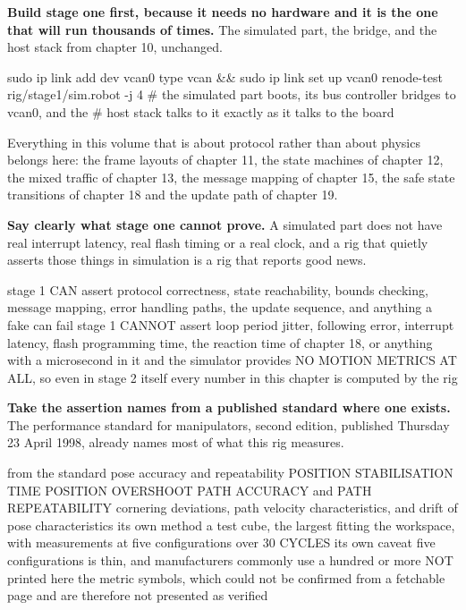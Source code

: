 \begin{steps}
\item \textbf{Build stage one first, because it needs no hardware and it is the
one that will run thousands of times.} The simulated part, the bridge, and the
host stack from chapter 10, unchanged.
\begin{shellcode}
sudo ip link add dev vcan0 type vcan && sudo ip link set up vcan0
renode-test rig/stage1/sim.robot -j 4
# the simulated part boots, its bus controller bridges to vcan0, and the
# host stack talks to it exactly as it talks to the board
\end{shellcode}
Everything in this volume that is about protocol rather than about physics
belongs here: the frame layouts of chapter 11, the state machines of chapter 12,
the mixed traffic of chapter 13, the message mapping of chapter 15, the safe
state transitions of chapter 18 and the update path of chapter 19.

\item \textbf{Say clearly what stage one cannot prove.} A simulated part does
not have real interrupt latency, real flash timing or a real clock, and a rig
that quietly asserts those things in simulation is a rig that reports good news.
\begin{plaincode}
stage 1 CAN assert    protocol correctness, state reachability, bounds
                      checking, message mapping, error handling paths,
                      the update sequence, and anything a fake can fail
stage 1 CANNOT assert loop period jitter, following error, interrupt
                      latency, flash programming time, the reaction time
                      of chapter 18, or anything with a microsecond in it
and the simulator      provides NO MOTION METRICS AT ALL, so even in stage 2
itself                 every number in this chapter is computed by the rig
\end{plaincode}

\item \textbf{Take the assertion names from a published standard where one
exists.} The performance standard for manipulators, second edition, published
Thursday 23 April 1998, already names most of what this rig measures.
\begin{plaincode}
from the standard   pose accuracy and repeatability
                    POSITION STABILISATION TIME
                    POSITION OVERSHOOT
                    PATH ACCURACY and PATH REPEATABILITY
                    cornering deviations, path velocity characteristics,
                    and drift of pose characteristics
its own method      a test cube, the largest fitting the workspace, with
                    measurements at five configurations over 30 CYCLES
its own caveat      five configurations is thin, and manufacturers commonly
                    use a hundred or more
NOT printed here    the metric symbols, which could not be confirmed from a
                    fetchable page and are therefore not presented as
                    verified
\end{plaincode}


\end{steps}
